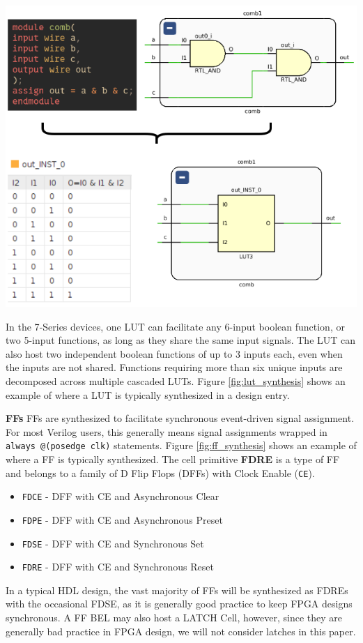 \documentclass{article}
\begin{document}
\begin{multicols}{2}
        {
            \centering
            \includegraphics[width=\columnwidth]{figures/lut_synthesis.png}
            \label{fig:lut_synthesis}
        }
        \vspace{1.0cm}

        In the 7‑Series devices, one LUT can facilitate any 6-input boolean function, or two 5-input functions, as long as they share the same input signals.  
        The LUT can also host two independent boolean functions of up to 3 inputs each, even when the inputs are not shared.  
        Functions requiring more than six unique inputs are decomposed across multiple cascaded LUTs.
        Figure \ref{fig:lut_synthesis} shows an example of where a LUT is typically synthesized in a design entry. 


    \textbf{FFs} \quad
        FFs are synthesized to facilitate synchronous event-driven signal assignment. 
        For most Verilog users, this generally means signal assignments wrapped in \texttt{always @(posedge clk)} statements. 
        Figure \ref{fig:ff_synthesis} shows an example of where a FF is typically synthesized. 
        The cell primitive \textbf{FDRE} is a type of FF and belongs to a family of D Flip Flops (DFFs) with Clock Enable (\texttt{CE}). 
        \begin{itemize}
            \item \texttt{FDCE} - DFF with CE and Asynchronous Clear
            \item \texttt{FDPE} - DFF with CE and Asynchronous Preset
            \item \texttt{FDSE} - DFF with CE and Synchronous Set
            \item \texttt{FDRE} - DFF with CE and Synchronous Reset
        \end{itemize}
        In a typical HDL design, the vast majority of FFs will be synthesized as FDREs with the occasional FDSE, as it is generally good practice to keep FPGA designs synchronous. 
        A FF BEL may also host a LATCH Cell, however, since they are generally bad practice in FPGA design, we will not consider latches in this paper. 


\end{multicols}
\end{document}
